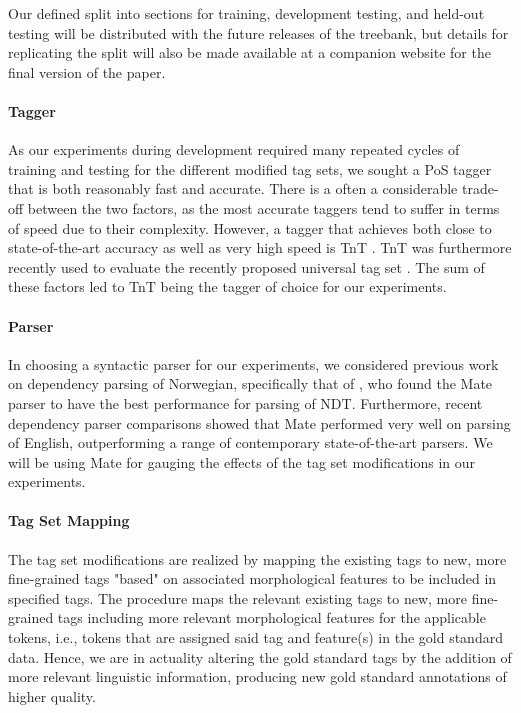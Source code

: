 \documentclass[11pt,a4paper]{article}
\begin{document}
Our defined split into sections for training, development testing, and held-out
testing will be distributed with the future releases of the treebank, but
details for replicating the split will also be made available at a companion website
for the final version of the paper.

\paragraph{Tagger}
As our experiments during development required many repeated cycles of training and
testing for the different modified tag sets, we sought a PoS tagger that is both
reasonably fast and accurate. There is a often a considerable trade-off between
the two factors, as the most accurate taggers tend to suffer in terms of speed
due to their complexity. However, a tagger that achieves both close to
state-of-the-art accuracy as well as very high speed is TnT \cite{Bra:00}. TnT
was furthermore recently used to evaluate the recently proposed universal tag
set \cite{Pet:Das:McD:12}. The sum of these factors led to TnT being the tagger
of choice for our experiments.

\paragraph{Parser}
In choosing a syntactic parser for our experiments, we considered previous work
on dependency parsing of Norwegian, specifically that of
, who found the Mate parser \cite{Boh:10} to have the
best performance for parsing of NDT. Furthermore, recent dependency parser
comparisons \cite{Cho:Tet:Ste:15} showed that Mate performed very well on
parsing of English, outperforming a range of contemporary state-of-the-art
parsers. We will be using Mate for gauging the effects of the tag set
modifications in our experiments.

\paragraph{Tag Set Mapping}
The tag set modifications are realized by mapping the existing tags to new,
more fine-grained tags "based" on associated morphological features to be
included in specified tags. The procedure maps the relevant existing tags to
new, more fine-grained tags including more relevant morphological features for
the applicable tokens, i.e., tokens that are assigned said tag and feature(s)
in the gold standard data. Hence, we are in actuality altering the gold
standard tags by the addition of more relevant linguistic information,
producing new gold standard annotations of higher quality.
\end{document}
